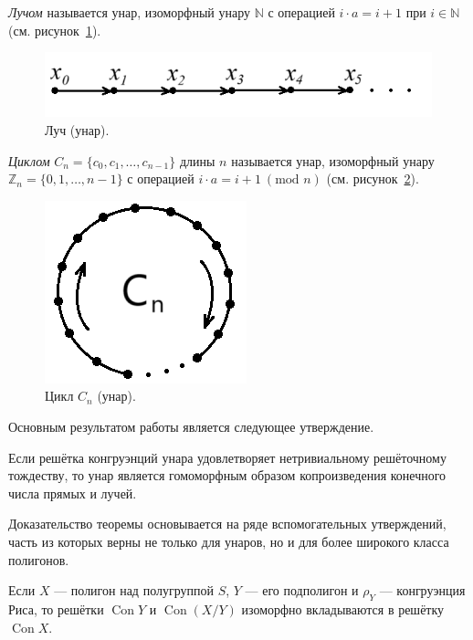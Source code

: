 \documentclass[11pt,twoside,final
]{article}
\def\Con{\operatorname{Con}}
\begin{document}
\textit{Лучом} называется унар, изоморфный унару $\mathbb{N}$ с операцией $i \cdot a = i + 1$ при $i \in \mathbb{N}$ (см. рисунок~\ref{fig:ray}).
\begin{figure}[ht!]
	\centering
	\includegraphics[scale=0.5]{img/ray.png}
	\caption{Луч (унар).}
	\label{fig:ray}
\end{figure}

\textit{Циклом} $C_n = \{ c_0, c_1, \ldots, c_{n - 1} \}$ длины $n$ называется унар, изоморфный унару $\mathbb{Z}_n = \{ 0, 1, \ldots, n - 1 \}$ с операцией $i \cdot a = i + 1 \ (\textrm{mod } n)$ (см. рисунок~\ref{fig:cycle}).
\begin{figure}[ht!]
	\centering
	\includegraphics[scale=0.4]{img/cycle.png}
	\caption{Цикл $C_n$ (унар).}
	\label{fig:cycle}
\end{figure}

Основным результатом работы является следующее утверждение.
\begin{theorem} \label{thm:main}
	Если решётка конгруэнций унара удовлетворяет нетривиальному решёточному тождеству, то унар является гомоморфным образом копроизведения конечного числа прямых и лучей.
\end{theorem}

Доказательство теоремы основывается на ряде вспомогательных утверждений, часть из которых верны не только для унаров, но и для более широкого класса полигонов.
\begin{lemma} \label{lemma:1}
	Если $X$ — полигон над полугруппой $S$, $Y$ — его подполигон и $\rho_Y$ — конгруэнция Риса, то решётки $\Con Y$ и $\Con (X/Y)$ изоморфно вкладываются в решётку $\Con X$.
\end{lemma}
\end{document}
